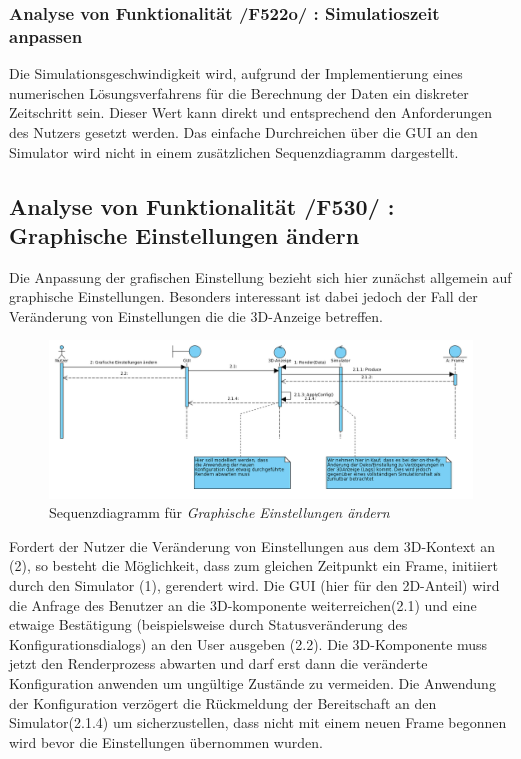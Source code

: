\subsubsection{Analyse von Funktionalität /F522o/ :  Simulatioszeit anpassen}
Die Simulationsgeschwindigkeit wird, aufgrund der Implementierung eines numerischen Lösungsverfahrens für die Berechnung der Daten ein diskreter Zeitschritt sein. Dieser Wert kann direkt und entsprechend
den Anforderungen des Nutzers gesetzt werden. Das einfache Durchreichen über die GUI an den Simulator wird nicht in einem zusätzlichen Sequenzdiagramm dargestellt.
\subsection{Analyse von Funktionalität /F530/ :  Graphische Einstellungen ändern}
Die Anpassung der grafischen Einstellung bezieht sich hier zunächst allgemein auf graphische Einstellungen. Besonders interessant ist dabei jedoch der Fall der Veränderung von Einstellungen die 
die 3D-Anzeige betreffen. 

\begin{figure}
\includegraphics[width=16cm]{bilder/change_graphic_config}
\caption{Sequenzdiagramm für \textit{Graphische Einstellungen ändern}}
\label{labelname}
\end{figure}
Fordert der Nutzer die Veränderung von Einstellungen aus dem 3D-Kontext an (2), so besteht die Möglichkeit, dass zum gleichen Zeitpunkt ein Frame, initiiert durch den Simulator (1), gerendert wird. 
Die GUI (hier für den 2D-Anteil) wird die Anfrage des Benutzer an die 3D-komponente weiterreichen(2.1) und eine etwaige Bestätigung (beispielsweise durch Statusveränderung des Konfigurationsdialogs) an den 
User ausgeben (2.2). Die 3D-Komponente muss jetzt den Renderprozess abwarten und darf erst dann die veränderte Konfiguration anwenden um ungültige Zustände zu vermeiden. Die Anwendung der Konfiguration verzögert 
die Rückmeldung der Bereitschaft an den Simulator(2.1.4) um sicherzustellen, dass nicht mit einem neuen Frame begonnen wird bevor die Einstellungen übernommen wurden. 

